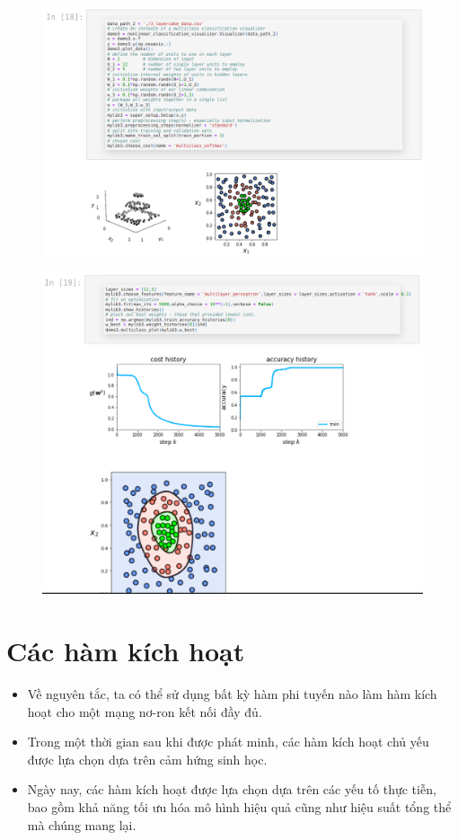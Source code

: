 \documentclass{book}
\begin{document}
    \begin{figure}[H]
        \centering
        \includegraphics[width=1.0\linewidth]{images/mau5.png}
        \label{fig:mau5}
    \end{figure}
    \begin{figure}[H]
        \centering
        \includegraphics[width=0.95\linewidth]{images/mau6.png}
        \label{fig:mau6}
    \end{figure}
\section{Các hàm kích hoạt}

\begin{itemize}
    \item Về nguyên tắc, ta có thể sử dụng bất kỳ hàm phi tuyến nào làm hàm kích hoạt cho một mạng nơ-ron kết nối đầy đủ.
    \item Trong một thời gian sau khi được phát minh, các hàm kích hoạt chủ yếu được lựa chọn dựa trên cảm hứng sinh học.
    \item Ngày nay, các hàm kích hoạt được lựa chọn dựa trên các yếu tố thực tiễn, bao gồm khả năng tối ưu hóa mô hình hiệu quả cũng như hiệu suất tổng thể mà chúng mang lại.
\end{itemize}
\end{document}
